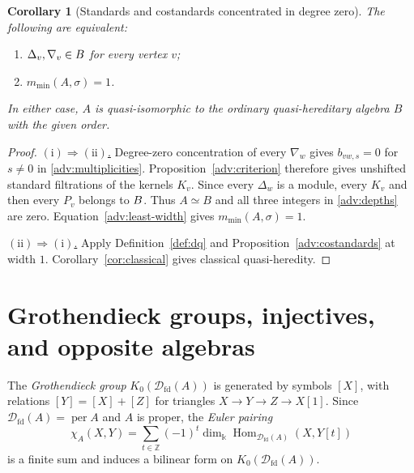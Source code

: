\documentclass[11pt,a4paper]{article}
\newcommand{\defn}[1]{\textsl{\color{darkblue} #1}}
\newcommand{\D}{\mathcal D}
\newcommand{\ZZ}{\mathbb{Z}}
\newcommand{\std}{\Delta}
\newcommand{\costd}{\nabla}
\DeclareMathOperator{\fd}{fd}
\DeclareMathOperator{\Hom}{Hom}
\DeclareMathOperator{\per}{per}
\let\mod\relax
\DeclareMathOperator{\mod}{mod}
\theoremstyle{plain}
\newtheorem{corollary}[theorem]{Corollary}
\theoremstyle{definition}
\numberwithin{equation}{section}
\begin{document}
\begin{corollary}[Standards and costandards concentrated in degree zero]
\label{adv:both-hearts}
The following are equivalent:
\begin{enumerate}[label=\textup{(\roman*)}]
\item $\std_v,\costd_v\in\mod B$ for every vertex $v$;
\item $m_{\min}(A,\sigma)=1$.
\end{enumerate}
In either case, $A$ is quasi-isomorphic to the ordinary
quasi-hereditary algebra $B$ with the given order.
\end{corollary}
\begin{proof}
\noindent\underline{$(\mathrm{i})\Rightarrow(\mathrm{ii})$.}
Degree-zero concentration of every $\costd_w$ gives $b_{vw,s}=0$
for $s\neq0$ in \eqref{adv:multiplicities}.
Proposition~\ref{adv:criterion} therefore gives unshifted standard
filtrations of the kernels $K_v$. Since every $\std_w$ is a module,
every $K_v$ and then every $P_v$ belongs to $\mod B$.
Thus $A\simeq B$ and all three integers in
\eqref{adv:depths} are zero. Equation~\eqref{adv:least-width}
gives $m_{\min}(A,\sigma)=1$.

\noindent\underline{$(\mathrm{ii})\Rightarrow(\mathrm{i})$.}
Apply Definition~\ref{def:dq} and
Proposition~\ref{adv:costandards} at width $1$.
Corollary~\ref{cor:classical} gives classical quasi-heredity.
\end{proof}

\section{Grothendieck groups, injectives, and opposite algebras}
\label{adv:opposite-section}

The \defn{Grothendieck group} $K_0(\D_{\fd}(A))$ is generated by
symbols $[X]$, with relations $[Y]=[X]+[Z]$ for triangles
$X\to Y\to Z\to X[1]$.
Since $\D_{\fd}(A)=\per A$ and $A$ is proper, the \defn{Euler pairing}
\begin{equation}\label{adv:euler}
 \chi_A(X,Y)=\sum_{t\in\ZZ}(-1)^t
 \dim_{\Bbbk}\Hom_{\D_{\fd}(A)}(X,Y[t])
\end{equation}
is a finite sum and induces a bilinear form on
$K_0(\D_{\fd}(A))$.
\end{document}
